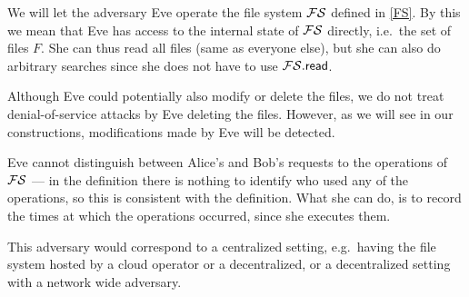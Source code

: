 We will let the adversary Eve operate the file system \(\FS\) defined in 
\cref{FS}.
By this we mean that Eve has access to the internal state of \(\FS\) directly, 
i.e.\ the set of files \(F\).
She can thus read all files (same as everyone else), but she can also do 
arbitrary searches since she does not have to use \(\fsread\).

Although Eve could potentially also modify or delete the files, we do not treat 
denial-of-service attacks by Eve deleting the files.
However, as we will see in our constructions, modifications made by Eve will be 
detected.

Eve cannot distinguish between Alice's and Bob's requests to the operations of 
\(\FS\) --- in the definition there is nothing to identify who used any of the 
operations, so this is consistent with the definition.
What she can do, is to record the times at which the operations occurred, since 
she executes them.

This adversary would correspond to a centralized setting, e.g.\ having the file 
system hosted by a cloud operator or a decentralized, or a decentralized 
setting with a network wide adversary.
